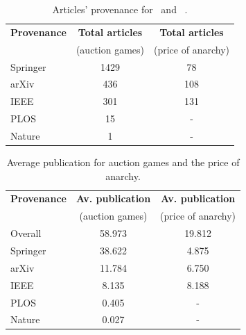 \documentclass{article}
\theoremstyle{definition}
\begin{document}
\begin{table}[!hbtp]
    \begin{center}
    \begin{tabular}{lcc}
        \toprule
        \textbf{Provenance} & \textbf{Total articles} & \textbf{Total articles}\\
                   & (auction games) & (price of anarchy)\\
        \midrule
        Springer   &                1429 &                78 \\
        arXiv      &                 436 &                108 \\
        IEEE       &                 301 &                131 \\
        PLOS       &                  15 &                 -  \\
        Nature     &                   1 &                 -   \\
        \bottomrule
    \end{tabular}
    \end{center}
    \caption{Articles' provenance for~\cite{} and ~\cite{}.}
    \label{table:provenance_other_topics}
\end{table}

\begin{table}[!hbtp]
    \begin{center}
    \begin{tabular}{lcc}
        \toprule
        \textbf{Provenance} & \textbf{Av. publication}  & \textbf{Av. publication}\\
                            & (auction games) & (price of anarchy)\\
        \midrule
        Overall             &          58.973 & 19.812 \\
        Springer            &          38.622 & 4.875  \\
        arXiv               &          11.784 & 6.750   \\
        IEEE                &           8.135 & 8.188    \\
        PLOS                &           0.405 &   -       \\
        Nature              &           0.027 &   -        \\
        \bottomrule
    \end{tabular}
    \end{center}
    \caption{Average publication for auction games and the price of anarchy.}
    \label{table:other_topics_publication_rates}
\end{table}
\end{document}
